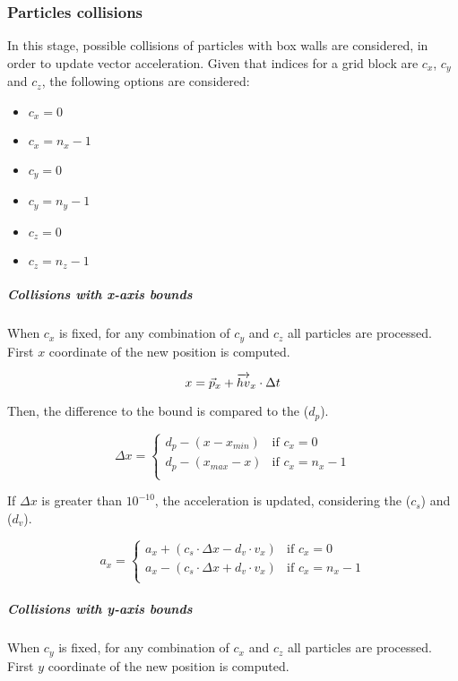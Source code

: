 \subsubsection{Particles collisions}

In this stage, possible collisions of particles with box walls are considered,
in order to update vector acceleration. 
Given that indices for a grid block are $c_x$, $c_y$ and $c_z$, the following
options are considered:

\begin{itemize}
\item $c_x=0$
\item $c_x=n_x-1$
\item $c_y=0$
\item $c_y=n_y-1$
\item $c_z=0$
\item $c_z=n_z-1$
\end{itemize}

\subparagraph{Collisions with x-axis bounds}

When $c_x$ is fixed, for any combination of $c_y$ and $c_z$ all particles are
processed. First $x$ coordinate of the new position is computed.

\[
x = \vec{p}_x + \overrightarrow{hv}_x \cdot \Delta t \\
\]

Then, the difference to the bound is compared to the  ($d_p$).

\[
\Delta x = 
\begin{cases}
d_p - (x - x_{min}) & \text{if } c_x = 0\\
d_p - (x_{max} - x) & \text{if } c_x = n_x -1\\
\end{cases}
\]

If $\Delta x$ is greater than $10^{-10}$, the acceleration is updated,
considering the  ($c_s$) and 
($d_v$).

\[
a_x = 
\begin{cases}
  a_x + ( c_s \cdot \Delta x - d_v \cdot v_x ) & \text{if  } c_x = 0\\
  a_x - ( c_s \cdot \Delta x + d_v \cdot v_x ) & \text{if  } c_x = n_x-1\\
\end{cases}
\]

\subparagraph{Collisions with y-axis bounds}

When $c_y$ is fixed, for any combination of $c_x$ and $c_z$ all particles are
processed. First $y$ coordinate of the new position is computed.

